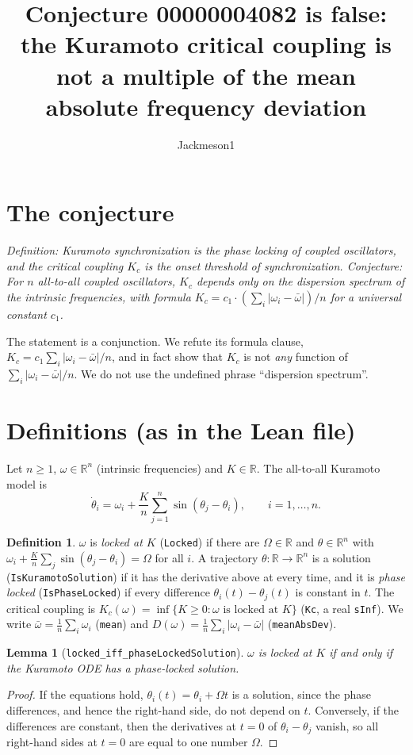 \documentclass[11pt]{article}
\title{Conjecture 00000004082 is false:\\ the Kuramoto critical coupling is not a multiple of the mean absolute frequency deviation}
\author{Jackmeson1}
\date{}
\newtheorem{lemma}[theorem]{Lemma}
\theoremstyle{definition}
\newtheorem{definition}[theorem]{Definition}
\theoremstyle{remark}
\begin{document}
\maketitle

\section{The conjecture}

\emph{Definition: Kuramoto synchronization is the phase locking of coupled oscillators, and the
critical coupling $K_c$ is the onset threshold of synchronization. Conjecture: For $n$ all-to-all
coupled oscillators, $K_c$ depends only on the dispersion spectrum of the intrinsic frequencies,
with formula $K_c = c_1 \cdot (\sum_i |\omega_i - \bar\omega|)/n$ for a universal constant $c_1$.}

The statement is a conjunction. We refute its formula clause,
$K_c = c_1 \sum_i|\omega_i-\bar\omega|/n$, and in fact show that $K_c$ is not \emph{any}
function of $\sum_i|\omega_i-\bar\omega|/n$. We do not use the undefined phrase
``dispersion spectrum''.

\section{Definitions (as in the Lean file)}

Let $n\ge 1$, $\omega\in\mathbb R^n$ (intrinsic frequencies) and $K\in\mathbb R$. The all-to-all
Kuramoto model is
\[
  \dot\theta_i = \omega_i + \frac{K}{n}\sum_{j=1}^n \sin(\theta_j-\theta_i),\qquad i=1,\dots,n .
\]
\begin{definition}
$\omega$ is \emph{locked at $K$} (\texttt{Locked}) if there are $\Omega\in\mathbb R$ and
$\theta\in\mathbb R^n$ with $\omega_i + \frac Kn\sum_j\sin(\theta_j-\theta_i)=\Omega$ for all $i$.
A trajectory $\theta:\mathbb R\to\mathbb R^n$ is a solution (\texttt{IsKuramotoSolution}) if
it has the derivative above at every time, and it is \emph{phase locked}
(\texttt{IsPhaseLocked}) if every difference $\theta_i(t)-\theta_j(t)$ is constant in $t$.
The critical coupling is
$K_c(\omega)=\inf\{K\ge 0 : \omega \text{ is locked at } K\}$ (\texttt{Kc}, a real
\texttt{sInf}). We write $\bar\omega=\frac1n\sum_i\omega_i$ (\texttt{mean}) and
$D(\omega)=\frac1n\sum_i|\omega_i-\bar\omega|$ (\texttt{meanAbsDev}).
\end{definition}

\begin{lemma}[\texttt{locked\_iff\_phaseLockedSolution}]
$\omega$ is locked at $K$ if and only if the Kuramoto ODE has a phase-locked solution.
\end{lemma}
\begin{proof}
If the equations hold, $\theta_i(t)=\theta_i+\Omega t$ is a solution, since the phase
differences, and hence the right-hand side, do not depend on $t$. Conversely, if the
differences are constant, then the derivatives at $t=0$ of $\theta_i-\theta_j$ vanish, so all
right-hand sides at $t=0$ are equal to one number $\Omega$.
\end{proof}
\end{document}
